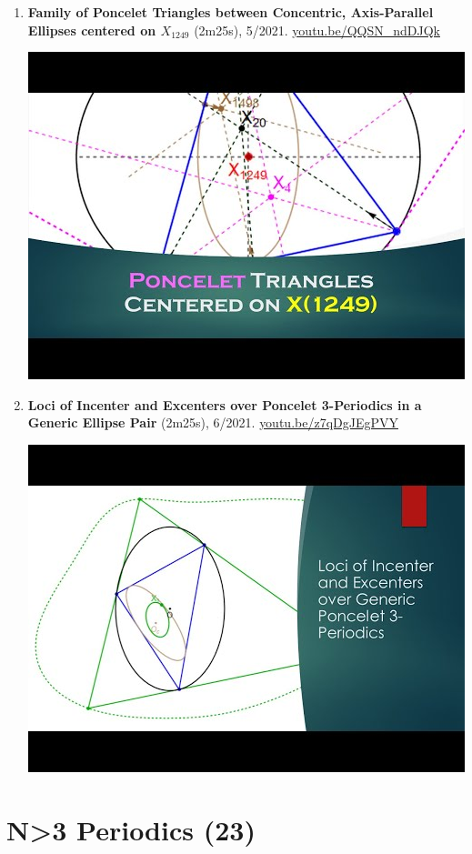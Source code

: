 \documentclass[12pt]{article}
\begin{document}
\begin{enumerate}[resume]
% 
\item \textbf{Family of Poncelet Triangles between Concentric, Axis-Parallel Ellipses centered on $X_{1249}$} (2m25s), 5/2021. \href{https://youtu.be/QQSN_ndDJQk}{\url{youtu.be/QQSN\_ndDJQk}}
\begin{center}\includegraphics[width=.5\textwidth]{pics/QQSN_ndDJQk.jpg}\end{center}
% 
\item \textbf{Loci of Incenter and Excenters over Poncelet 3-Periodics in a Generic Ellipse Pair} (2m25s), 6/2021. \href{https://youtu.be/z7qDgJEgPVY}{\url{youtu.be/z7qDgJEgPVY}}
\begin{center}\includegraphics[width=.5\textwidth]{pics/z7qDgJEgPVY.jpg}\end{center}
% 
\end{enumerate}

\section{N>3 Periodics (23)}
\end{document}
